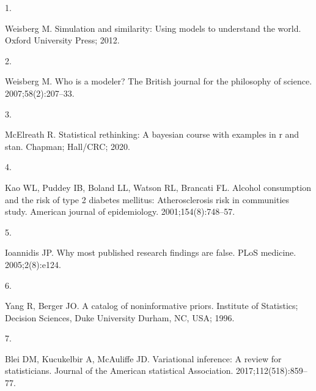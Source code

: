 \documentclass[
  10pt,
]{scrbook}
\newlength{\cslhangindent}
\newlength{\csllabelwidth}
\newlength{\cslentryspacingunit} %
\newenvironment{CSLReferences}[2] %
 {%
  \setlength{\parindent}{0pt}
  \ifodd #1
  \let\oldpar\par
  \def\par{\hangindent=\cslhangindent\oldpar}
  \fi
  \setlength{\parskip}{#2\cslentryspacingunit}
 }%
 {}
\newcommand{\CSLLeftMargin}[1]{\parbox[t]{\csllabelwidth}{#1}}
\newcommand{\CSLRightInline}[1]{\parbox[t]{\linewidth - \csllabelwidth}{#1}\break}
\begin{document}
\hypertarget{refs}{}
\begin{CSLReferences}{0}{0}
\leavevmode{}%
\CSLLeftMargin{1. }
\CSLRightInline{Weisberg M. Simulation and similarity: Using models to understand the world. Oxford University Press; 2012. }

\leavevmode{}%
\CSLLeftMargin{2. }
\CSLRightInline{Weisberg M. Who is a modeler? The British journal for the philosophy of science. 2007;58(2):207--33. }

\leavevmode{}%
\CSLLeftMargin{3. }
\CSLRightInline{McElreath R. Statistical rethinking: A bayesian course with examples in r and stan. Chapman; Hall/CRC; 2020. }

\leavevmode{}%
\CSLLeftMargin{4. }
\CSLRightInline{Kao WL, Puddey IB, Boland LL, Watson RL, Brancati FL. Alcohol consumption and the risk of type 2 diabetes mellitus: Atherosclerosis risk in communities study. American journal of epidemiology. 2001;154(8):748--57. }

\leavevmode{}%
\CSLLeftMargin{5. }
\CSLRightInline{Ioannidis JP. Why most published research findings are false. PLoS medicine. 2005;2(8):e124. }

\leavevmode{}%
\CSLLeftMargin{6. }
\CSLRightInline{Yang R, Berger JO. A catalog of noninformative priors. Institute of Statistics; Decision Sciences, Duke University Durham, NC, USA; 1996. }

\leavevmode{}%
\CSLLeftMargin{7. }
\CSLRightInline{Blei DM, Kucukelbir A, McAuliffe JD. Variational inference: A review for statisticians. Journal of the American statistical Association. 2017;112(518):859--77. }

\end{CSLReferences}

\printindex
\thispagestyle{empty}
\end{document}
